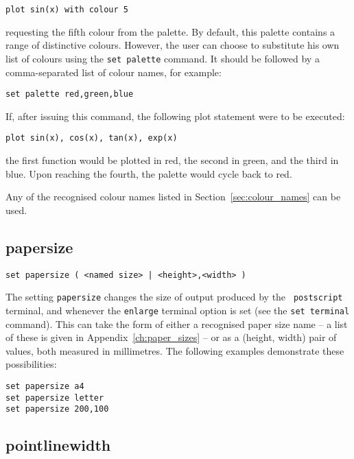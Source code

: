 \begin{verbatim}
plot sin(x) with colour 5
\end{verbatim}

\noindent requesting the fifth colour from the palette. By default, this palette
contains a range of distinctive colours. However, the user can choose to
substitute his own list of colours using the {\tt set palette} command. It
should be followed by a comma-separated list of colour names, for example:

\begin{verbatim}
set palette red,green,blue
\end{verbatim}

\noindent If, after issuing this command, the following plot statement were to
be executed:

\begin{verbatim}
plot sin(x), cos(x), tan(x), exp(x)
\end{verbatim}

\noindent the first function would be plotted in red, the second in green, and
the third in blue. Upon reaching the fourth, the palette would cycle back to
red.

Any of the recognised colour names listed in Section~\ref{sec:colour_names} can
be used.


\subsection{papersize}

\begin{verbatim}
set papersize ( <named size> | <height>,<width> )
\end{verbatim}

The setting {\tt papersize} changes the size of output produced by the {\tt
postscript} terminal, and whenever the {\tt enlarge} terminal option is set
(see the {\tt set terminal} command). This can take the form of either a
recognised paper size name -- a list of these is given in
Appendix~\ref{ch:paper_sizes} -- or as a (height, width) pair of values, both
measured in millimetres. The following examples demonstrate these
possibilities:

\begin{verbatim}
set papersize a4
set papersize letter
set papersize 200,100
\end{verbatim}


\subsection{pointlinewidth}

